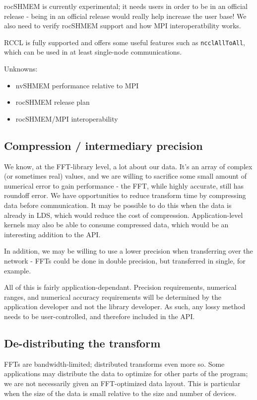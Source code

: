 \documentclass[12pt]{article}
\renewcommand{\(}{\left(}
\renewcommand{\)}{\right)}
\begin{document}
rocSHMEM is currently experimental; it needs users in order to be in
an official release - being in an official release would really help
increase the user base!  We also need to verify rocSHMEM support and
how MPI interoperatbility works.

RCCL is fully supported and offers some useful features such as
\texttt{ncclAllToAll}, which can be used in at least single-node
communications.

Unknowns:
\begin{itemize}
\item nvSHMEM performance relative to MPI
\item rocSHMEM release plan
\item rocSHMEM/MPI interoperability
\end{itemize}

\subsection{Compression / intermediary precision}

We know, at the FFT-library level, a lot about our data.  It's an
array of complex (or sometimes real) values, and we are willing to
sacrifice some small amount of numerical error to gain performance -
the FFT, while highly accurate, still has roundoff error.  We have
opportunities to reduce transform time by compressing data before
communication.  It may be possible to do this when the data is already
in LDS, which would reduce the cost of compression.  Application-level
kernels may also be able to consume compressed data, which would be an
interesting addition to the API.

In addition, we may be willing to use a lower precision when
transferring over the network - FFTs could be done in double
precision, but transferred in single, for example.

All of this is fairly application-dependant.  Precision requirements,
numerical ranges, and numerical accuracy requirements will be
determined by the application developer and not the library developer.
As such, any lossy method needs to be user-controlled, and therefore
included in the API.

\subsection{De-distributing the transform}

FFTs are bandwidth-limited; distributed transforms even more so.  Some
applications may distribute the data to optimize for other parts of
the program; we are not necessarily given an FFT-optimized data
layout.  This is particular when the size of the data is small
relative to the size and number of devices.
\end{document}
